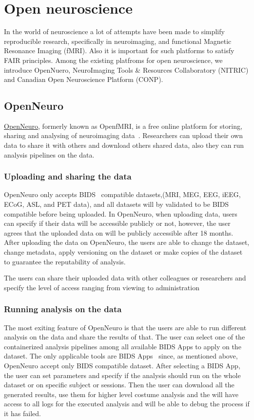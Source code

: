 \section{Open neuroscience}
In the world of neuroscience a lot of attempts have been
 made to simplify reproducible research, specifically in neuroimaging, and functional Magnetic Resonance Imaging (fMRI)\cite{Schottner_2020}. Also it is important for such platforms to satisfy FAIR principles. Among the existing platfroms for open neuroscience, we introduce OpenNuero, NeuroImaging Tools \& Resources Collaboratory (NITRIC) and Canadian Open Neuroscience Platform (CONP).


\subsection{OpenNeuro}
\href{https://openneuro.org}{OpenNeuro}, formerly known as OpenfMRI\cite{poldrack2017openfmri}, is a free online platform for storing, sharing and analysing of neuroimaging data~\cite{gorgolewski2017openneuro}. Researchers can upload their own data to share it with others and download others shared data, also they can run analysis pipelines on the data. 

\subsubsection{Uploading and sharing the data}
 OpenNeuro only accepts BIDS~\cite{gorgolewski2016brain} compatible datasets,(MRI, MEG, EEG, iEEG, ECoG, ASL, and PET data), and all datasets will by validated to be BIDS compatible before being uploaded. In OpenNeuro, when uploading data, users can specify if their data will be accessible publicly or not, however, the user agrees that the uploaded data on will be publicly accessible after 18 months. After uploading the data on OpenNeuro, the users are able to change the dataset, change metadata, apply versioning on the dataset or make copies of the dataset to guarantee the reputability of analysis. 
 
 The users can share their uploaded data with other colleagues or researchers and specify the level of access ranging from viewing to administration 

\subsubsection{Running analysis on the data }
The most exiting feature of OpenNeuro is that the users are able to run different analysis on the data and share the results of that. The user can select one of the containerized analysis pipelines among all available BIDS Apps to apply on the dataset. The only applicable tools are BIDS Apps~\cite{gorgolewski2017bids} since, as mentioned above, OpenNeuro accept only BIDS compatible dataset. After selecting a BIDS App, the user can set parameters and specify if the analysis should run on the whole dataset or on specific subject or sessions. Then the user can download all the generated results, use them for higher level costume analysis and the will have access to all logs for the executed analysis and will be able to debug the process if it has failed.


